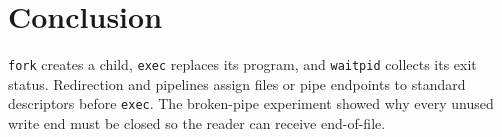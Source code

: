 \documentclass[12pt]{article}
\begin{document}
\section{Conclusion}
\texttt{fork} creates a child, \texttt{exec} replaces its program, and
\texttt{waitpid} collects its exit status. Redirection and pipelines assign
files or pipe endpoints to standard descriptors before \texttt{exec}. The
broken-pipe experiment showed why every unused write end must be closed so
the reader can receive end-of-file.
\end{document}
